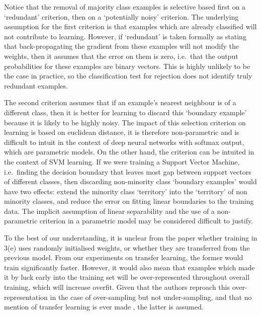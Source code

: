 \documentclass[a4paper,11pt]{article}
\begin{document}
Notice that the removal of majority class examples is selective based first on a `redundant' criterion, then on a `potentially noisy' criterion. The underlying assumption for the first criterion is that examples which are already classified will not contribute to learning. However, if `redundant' is taken formally as stating that back-propagating the gradient from these examples will not modify the weights, then it assumes that the error on them is zero, i.e.\ that the output probabilities for these examples are binary vectors. This is highly unlikely to be the case in practice, so the classification test for rejection does not identify truly redundant examples. 

The second criterion assumes that if an example's nearest neighbour is of a different class, then it is better for learning to discard this `boundary example' because it is likely to be highly noisy. The impact of this selection criterion on learning is based on euclidean distance, it is therefore non-parametric and is difficult to intuit in the context of deep neural networks with softmax output, which are parametric models. On the other hand, the criterion can be intuited in the context of SVM learning. If we were training a Support Vector Machine, i.e.\ finding the decision boundary that leaves most gap between support vectors of different classes, then discarding non-minority class `boundary examples' would have two effects: extend the minority class `territory' into the `territory' of non minority classes, and reduce the error on fitting linear boundaries to the training data. The implicit assumption of linear separability and the use of a non-parametric criterion in a parametric model may be considered difficult to justify.

To the best of our understanding, it is unclear from the paper whether training in 3(e) uses randomly initialised weights, or whether they are transferred from the previous model. From our experiments on transfer learning, the former would train significantly faster. However, it would also mean that examples which made it by luck early into the training set will be over-represented throughout overall training, which will increase overfit. Given that the authors reproach this over-representation in the case of over-sampling but not under-sampling, and that no mention of transfer learning is ever made \cite{zhou}, the latter is assumed.
\end{document}
